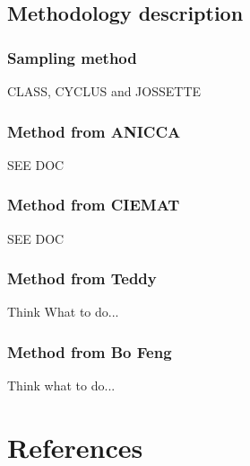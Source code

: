 \documentclass[review]{elsarticle}
\begin{document}
\subsection{Methodology description}\label{section:Methodology}




    \subsubsection{Sampling method}

CLASS, CYCLUS and JOSSETTE

    \subsubsection{Method from ANICCA}

SEE DOC

    \subsubsection{Method from CIEMAT}

SEE DOC

    \subsubsection{Method from Teddy}

Think What to do...

    \subsubsection{Method from Bo Feng}

Think what to do...







\section*{References}


\end{document}
